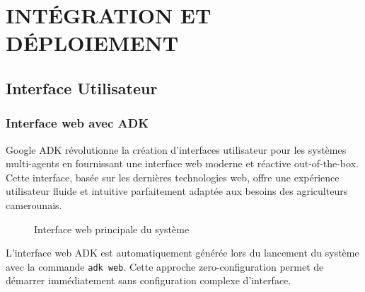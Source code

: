 \chapter*{ INTÉGRATION ET DÉPLOIEMENT}

\section{Interface Utilisateur}

\subsection{Interface web avec ADK}

Google ADK révolutionne la création d'interfaces utilisateur pour les systèmes multi-agents en fournissant une interface web moderne et réactive out-of-the-box. Cette interface, basée sur les dernières technologies web, offre une expérience utilisateur fluide et intuitive parfaitement adaptée aux besoins des agriculteurs camerounais.

\begin{figure}[h]
\centering
{}
\caption{Interface web principale du système}
\end{figure}

L'interface web ADK est automatiquement générée lors du lancement du système avec la commande \texttt{adk web}. Cette approche zero-configuration permet de démarrer immédiatement sans configuration complexe d'interface.

